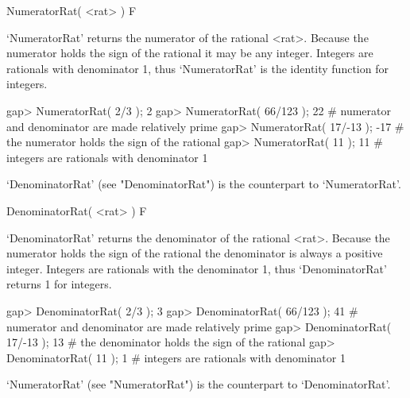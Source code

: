 \>NumeratorRat( <rat> ) F

`NumeratorRat'  returns  the numerator of the rational <rat>.   Because  the
numerator holds the sign of the rational it may be any integer.  Integers
are rationals  with  denominator  1, thus  `NumeratorRat'  is  the  identity
function for integers.

\beginexample
gap> NumeratorRat( 2/3 );
2
gap> NumeratorRat( 66/123 );
22    # numerator and denominator are made relatively prime
gap> NumeratorRat( 17/-13 );
-17    # the numerator holds the sign of the rational
gap> NumeratorRat( 11 );
11    # integers are rationals with denominator 1 
\endexample

`DenominatorRat' (see "DenominatorRat") is the counterpart to `NumeratorRat'.


\>DenominatorRat( <rat> ) F

`DenominatorRat' returns the denominator of the rational <rat>.  Because the
numerator  holds the  sign of  the rational  the denominator  is always a
positive integer.   Integers are rationals  with  the denominator 1, thus
`DenominatorRat' returns 1 for integers.

\beginexample
gap> DenominatorRat( 2/3 );
3
gap> DenominatorRat( 66/123 );
41    # numerator and denominator are made relatively prime
gap> DenominatorRat( 17/-13 );
13    # the denominator holds the sign of the rational
gap> DenominatorRat( 11 );
1    # integers are rationals with denominator 1 
\endexample

`NumeratorRat' (see "NumeratorRat") is the counterpart to `DenominatorRat'.
